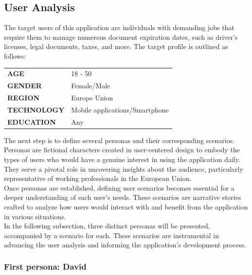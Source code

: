 \subsection{User Analysis}
The target users of this application are individuals with demanding jobs that require them to manage numerous document expiration dates, such as driver's licenses, legal documents, taxes, and more. The target profile is outlined as follows:
\begin{table}[H]
	\centering
	\begin{tabularx}{\textwidth}{XX}
		\textbf{AGE}& 18 - 50\\
		\textbf{GENDER}& Female/Male\\
		\textbf{REGION}& Europe Union\\
		\textbf{TECHNOLOGY}&Mobile applications/Smartphone\\
		\textbf{EDUCATION}& Any\\
	\end{tabularx}
\end{table}
\noindent
The next step is to define several personas and their corresponding scenarios. Personas are fictional characters created in user-centered design to embody the types of users who would have a genuine interest in using the application daily. They serve a pivotal role in uncovering insights about the audience, particularly representative of working professionals in the European Union.\\
Once personas are established, defining user scenarios becomes essential for a deeper understanding of each user's needs. These scenarios are narrative stories crafted to analyze how users would interact with and benefit from the application in various situations.\\
In the following subsection, three distinct personas will be presented, accompanied by a scenario for each. These scenarios are instrumental in advancing the user analysis and informing the application's development process.\\
\subsubsection{First persona: David}

